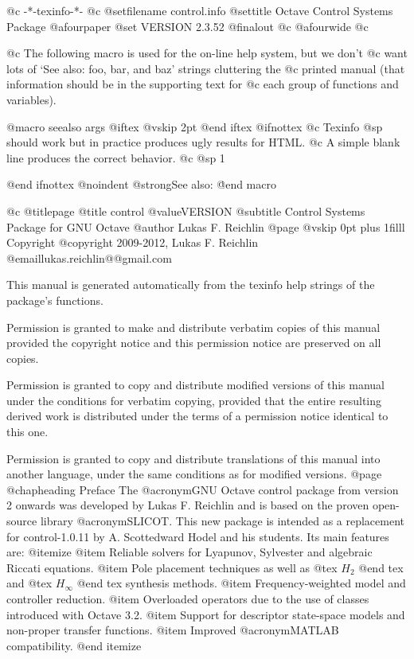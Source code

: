    @c -*-texinfo-*-
@c %
@setfilename control.info
@settitle Octave Control Systems Package
@afourpaper
@set VERSION 2.3.52
@finalout
@c @afourwide
@c %


@c The following macro is used for the on-line help system, but we don't
@c want lots of `See also: foo, bar, and baz' strings cluttering the
@c printed manual (that information should be in the supporting text for
@c each group of functions and variables).

@macro seealso {args}
@iftex
@vskip 2pt
@end iftex
@ifnottex
@c Texinfo @sp should work but in practice produces ugly results for HTML.
@c A simple blank line produces the correct behavior. 
@c @sp 1

@end ifnottex
@noindent
@strong{See also:} \args\.
@end macro


@c %
@titlepage
@title control @value{VERSION}
@subtitle Control Systems Package for GNU Octave
@author Lukas F. Reichlin
@page
@vskip 0pt plus 1filll
Copyright @copyright{} 2009-2012, Lukas F. Reichlin @email{lukas.reichlin@@gmail.com}

This manual is generated automatically from the texinfo help strings
of the package's functions.

Permission is granted to make and distribute verbatim copies of
this manual provided the copyright notice and this permission notice
are preserved on all copies.

Permission is granted to copy and distribute modified versions of this
manual under the conditions for verbatim copying, provided that the entire
resulting derived work is distributed under the terms of a permission
notice identical to this one.

Permission is granted to copy and distribute translations of this manual
into another language, under the same conditions as for modified versions.
@page
@chapheading Preface
The @acronym{GNU} Octave control package from version 2 onwards was
developed by Lukas F. Reichlin and is based on the proven open-source
library @acronym{SLICOT}. This new package is intended as a replacement
for control-1.0.11 by A. Scottedward Hodel and his students.
Its main features are:
@itemize
@item Reliable solvers for Lyapunov, Sylvester and algebraic Riccati equations.
@item Pole placement techniques as well as @tex $ H_2 $ @end tex
and @tex $ H_{\infty} $ @end tex
synthesis methods.
@item Frequency-weighted model and controller reduction.
@item Overloaded operators due to the use of classes introduced with Octave 3.2.
@item Support for descriptor state-space models and non-proper transfer functions.
@item Improved @acronym{MATLAB} compatibility.
@end itemize

